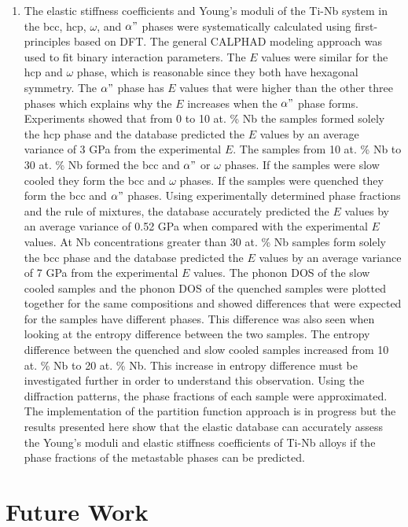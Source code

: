 \begin{enumerate}
	\item The elastic stiffness coefficients and Young's moduli of the Ti-Nb system in the bcc, hcp, $\omega$, and $\alpha"$ phases were systematically calculated using first-principles based on DFT. The general CALPHAD modeling approach was used to fit binary interaction parameters. The $E$ values were similar for the hcp and $\omega$ phase, which is reasonable since they both have hexagonal symmetry. The $\alpha"$ phase has $E$ values that were higher than the other three phases which explains why the $E$ increases when the $\alpha"$ phase forms. Experiments showed that from 0 to 10 at. \% Nb the samples formed solely the hcp phase and the database predicted the $E$ values by an average variance of 3 GPa from the experimental $E$. The samples from 10 at. \% Nb to 30 at. \% Nb formed the bcc and $\alpha"$ or $\omega$ phases. If the samples were slow cooled they form the bcc and $\omega$ phases. If the samples were quenched they form the bcc and $\alpha"$ phases. Using experimentally determined phase fractions and the rule of mixtures, the database accurately predicted the $E$ values by an average variance of 0.52 GPa when compared with the experimental $E$ values. At Nb concentrations greater than 30 at. \% Nb samples form solely the bcc phase and the database predicted the $E$ values by an average variance of 7 GPa from the experimental $E$ values. The phonon DOS of the slow cooled samples and the phonon DOS of the quenched samples were plotted together for the same compositions and showed differences that were expected for the samples have different phases. This difference was also seen when looking at the entropy difference between the two samples. The entropy difference between the quenched and slow cooled samples increased from 10 at. \% Nb to 20 at. \% Nb. This increase in entropy difference must be investigated further in order to understand this observation. Using the diffraction patterns, the phase fractions of each sample were approximated. The implementation of the partition function approach is in progress but the results presented here show that the elastic database can accurately assess the Young's moduli and elastic stiffness coefficients of Ti-Nb alloys if the phase fractions of the metastable phases can be predicted.
\end{enumerate}

\section{Future Work}

